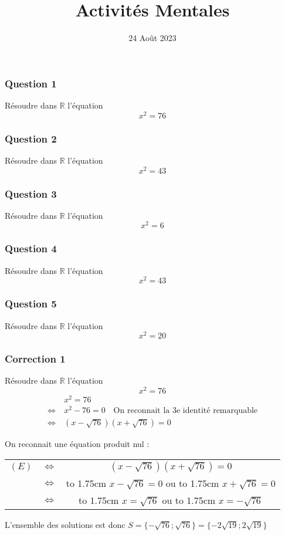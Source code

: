 \documentclass[15pt, mathserif]{beamer}
\title{Activités Mentales}
\date{24 Août 2023}
\newcommand{\R}{\mathbb{R}}			%
\begin{document}
\begin{frame}
    \titlepage
\end{frame}

\begin{frame} 
	\frametitle{Question 1}
Résoudre dans $\R$ l'équation $$x^2=76$$ 
 
 \end{frame}


\begin{frame} 
	\frametitle{Question 2}
Résoudre dans $\R$ l'équation $$x^2=43$$ 
 
 \end{frame}


\begin{frame} 
	\frametitle{Question 3}
Résoudre dans $\R$ l'équation $$x^2=6$$ 
 
 \end{frame}


\begin{frame} 
	\frametitle{Question 4}
Résoudre dans $\R$ l'équation $$x^2=43$$ 
 
 \end{frame}


\begin{frame} 
	\frametitle{Question 5}
Résoudre dans $\R$ l'équation $$x^2=20$$ 
 
 \end{frame}


\begin{frame}
\vspace{-10mm}
	\frametitle{Correction 1}
Résoudre dans $\R$ l'équation $$x^2=76$$ 
 \begin{align*} 
 & x^2=76 \\ 
 \Leftrightarrow ~& x^2- 76 =0 \text{~~ On reconnait la 3e identité remarquable} \\ 
 \Leftrightarrow ~ & (x-\sqrt{76})(x+\sqrt{76})=0 
 \end{align*}
 
  On reconnait une équation produit nul : 
 
 	\begin{tabular}{ccc} $(E)$ & $\Leftrightarrow$ & $(x-\sqrt{76})(x+ \sqrt{76})=0$  \\
		& $\Leftrightarrow$ &  \hbox to 1.75cm {\hfill $x-\sqrt{76}= 0$\hfill} \quad  ou \quad  \hbox to 1.75cm {\hfill $x+\sqrt{76}=0$\hfill} \\
		 & $\Leftrightarrow$ & \hbox to 1.75cm {\hfill $x = \sqrt{76} $\hfill} \quad  ou \quad \hbox to 1.75cm {\hfill $x = -\sqrt{76}$ \hfill} 
 \end{tabular} 
 
 L'ensemble des solutions est donc $S=\{-\sqrt{76};\sqrt{76}\}=\{-2\sqrt{19};2\sqrt{19}\}$ 
 
 \end{frame}
\end{document}
